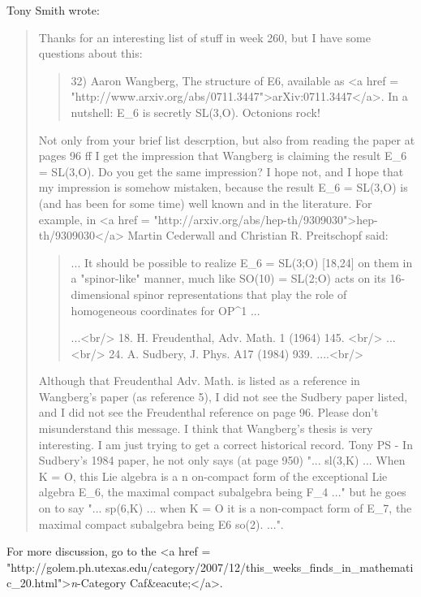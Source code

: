 Tony Smith wrote:


\begin{quote}
  Thanks for an interesting list of stuff in week 260,
  but I have some questions about this:

\begin{quote}
  32) Aaron Wangberg, The structure of E6, available as <a href = "http://www.arxiv.org/abs/0711.3447">arXiv:0711.3447</a>.
  In a nutshell: E_{6} is secretly SL(3,O). Octonions rock! 
\end{quote}

  Not only from your brief list descrption, but also from reading the  
  paper at pages 96 ff
  I get the impression that Wangberg is claiming the result E_{6} = SL(3,O).
  Do you get the same impression?
  I hope not, and I hope that my impression is somehow mistaken,
  because
  the result E_{6} = SL(3,O) is (and has been for some time) well known  
  and in the literature.
  For example, in <a href = "http://arxiv.org/abs/hep-th/9309030">hep-th/9309030</a> Martin Cederwall and Christian R.  
  Preitschopf said:
\begin{quote}

  ... It should be possible to realize E_{6} = SL(3;O) [18,24] on them in  
  a "spinor-like" manner, much like SO(10) = SL(2;O) acts on its 16-dimensional spinor representations that play the role of homogeneous  
  coordinates for OP^{1} ...

  ...<br/>
  18. H. Freudenthal, Adv. Math. 1 (1964) 145. <br/>
  ...<br/>
  24. A. Sudbery, J. Phys. A17 (1984) 939. ....<br/>
\end{quote}

  Although that Freudenthal Adv. Math. is listed as a reference in  
  Wangberg's paper (as reference 5), I did not see the Sudbery paper  
  listed, and I did not see the Freudenthal reference on page 96.
  Please don't misunderstand this message. I think that Wangberg's  
  thesis is very interesting. I am just trying to get a correct  
  historical record.
  Tony
  PS - In Sudbery's 1984 paper, he not only says (at page 950)
  "... sl(3,K) ... When K = O, this Lie algebra is a n on-compact form  
  of the exceptional Lie algebra E_{6}, the maximal compact subalgebra  
  being F_{4} ..."
  but he goes on to say
  "... sp(6,K) ... when K = O it is a non-compact form of E_{7}, the  
  maximal compact subalgebra being E6 \oplus  so(2). ...".
\end{quote}



For more discussion, go to the
<a href = "http://golem.ph.utexas.edu/category/2007/12/this_weeks_finds_in_mathematic_20.html">\emph{n}-Category Caf&eacute;</a>.


